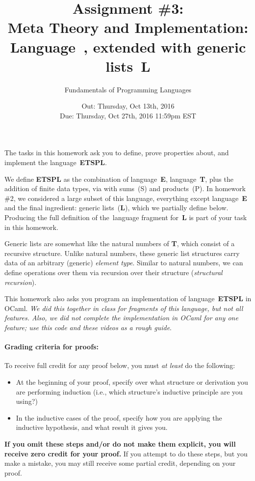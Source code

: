 \documentclass[11pt]{article}
\title{Assignment \#3: \\
  Meta Theory and Implementation:
  \\Language~\ETSP, extended with generic lists~\textbf{\textsf{L}}}
\author{Fundamentals of Programming Languages}
\date{Out: Thursday, Oct 13th, 2016\\
      Due: Thursday, Oct 27th, 2016 11:59pm EST}
\newcommand{\E}{\textbf{\textsf{E}}\xspace}
\newcommand{\T}{\textbf{\textsf{T}}\xspace}
\newcommand{\ETSPL}{\textbf{\textsf{ETSPL}}\xspace}
\newcommand{\Ll}{\textbf{\textsf{L}}\xspace}
\begin{document}
\maketitle

The tasks in this homework ask you to define, prove properties about,
and implement the language~\ETSPL.

We define \ETSPL as the combination of language~\E, language~\T, plus
the addition of finite data types, via with sums~(\textsf{S}) and
products~(\textsf{P}).  In homework \#2, we considered a large subset
of this language, everything except language~\E and the final
ingredient: generic lists~(\Ll), which we partially define below.
%
Producing the full definition of the~language fragment for~\Ll is part
of your task in this homework.

Generic lists are somewhat like the natural numbers of \T, which
consist of a recursive structure.
%
Unlike natural numbers, these generic list structures carry data of an
arbitrary (generic) \emph{element type}.
%
Similar to natural numbers, we can define operations over them via
recursion over their structure (\emph{structural recursion}).

This homework also asks you program an implementation of
language~\ETSPL in OCaml.
%
\emph{We did this together in class for fragments of this language,
  but not all features.  Also, we did not complete the implementation
  in OCaml for any one feature; use this code and these videos as a
  rough guide}.

\paragraph{Grading criteria for proofs:} 
To receive full credit for any proof below, you must \emph{at least} do the following:
\begin{itemize}
\item At the beginning of your proof, specify over what structure or
  derivation you are performing induction (i.e., which structure's
  inductive principle are you using?)
\item In the inductive cases of the proof, specify how you are applying the inductive hypothesis, and what result it gives you.
\end{itemize}
\textbf{If you omit these steps and/or do not make them explicit, you
  will receive zero credit for your proof.}  If you attempt to do
these steps, but you make a mistake, you may still receive some partial credit, depending on your proof.
\end{document}
